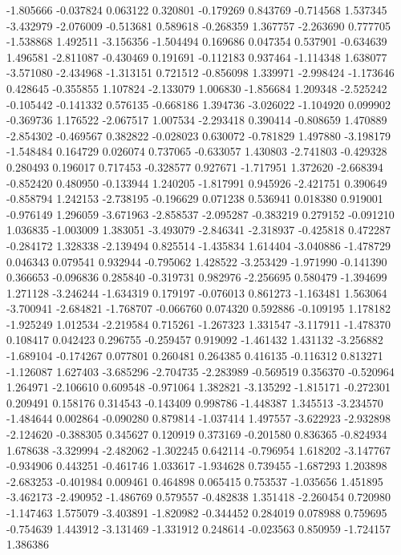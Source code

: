 -1.805666
-0.037824
0.063122
0.320801
-0.179269
0.843769
-0.714568
1.537345
-3.432979
-2.076009
-0.513681
0.589618
-0.268359
1.367757
-2.263690
0.777705
-1.538868
1.492511
-3.156356
-1.504494
0.169686
0.047354
0.537901
-0.634639
1.496581
-2.811087
-0.430469
0.191691
-0.112183
0.937464
-1.114348
1.638077
-3.571080
-2.434968
-1.313151
0.721512
-0.856098
1.339971
-2.998424
-1.173646
0.428645
-0.355855
1.107824
-2.133079
1.006830
-1.856684
1.209348
-2.525242
-0.105442
-0.141332
0.576135
-0.668186
1.394736
-3.026022
-1.104920
0.099902
-0.369736
1.176522
-2.067517
1.007534
-2.293418
0.390414
-0.808659
1.470889
-2.854302
-0.469567
0.382822
-0.028023
0.630072
-0.781829
1.497880
-3.198179
-1.548484
0.164729
0.026074
0.737065
-0.633057
1.430803
-2.741803
-0.429328
0.280493
0.196017
0.717453
-0.328577
0.927671
-1.717951
1.372620
-2.668394
-0.852420
0.480950
-0.133944
1.240205
-1.817991
0.945926
-2.421751
0.390649
-0.858794
1.242153
-2.738195
-0.196629
0.071238
0.536941
0.018380
0.919001
-0.976149
1.296059
-3.671963
-2.858537
-2.095287
-0.383219
0.279152
-0.091210
1.036835
-1.003009
1.383051
-3.493079
-2.846341
-2.318937
-0.425818
0.472287
-0.284172
1.328338
-2.139494
0.825514
-1.435834
1.614404
-3.040886
-1.478729
0.046343
0.079541
0.932944
-0.795062
1.428522
-3.253429
-1.971990
-0.141390
0.366653
-0.096836
0.285840
-0.319731
0.982976
-2.256695
0.580479
-1.394699
1.271128
-3.246244
-1.634319
0.179197
-0.076013
0.861273
-1.163481
1.563064
-3.700941
-2.684821
-1.768707
-0.066760
0.074320
0.592886
-0.109195
1.178182
-1.925249
1.012534
-2.219584
0.715261
-1.267323
1.331547
-3.117911
-1.478370
0.108417
0.042423
0.296755
-0.259457
0.919092
-1.461432
1.431132
-3.256882
-1.689104
-0.174267
0.077801
0.260481
0.264385
0.416135
-0.116312
0.813271
-1.126087
1.627403
-3.685296
-2.704735
-2.283989
-0.569519
0.356370
-0.520964
1.264971
-2.106610
0.609548
-0.971064
1.382821
-3.135292
-1.815171
-0.272301
0.209491
0.158176
0.314543
-0.143409
0.998786
-1.448387
1.345513
-3.234570
-1.484644
0.002864
-0.090280
0.879814
-1.037414
1.497557
-3.622923
-2.932898
-2.124620
-0.388305
0.345627
0.120919
0.373169
-0.201580
0.836365
-0.824934
1.678638
-3.329994
-2.482062
-1.302245
0.642114
-0.796954
1.618202
-3.147767
-0.934906
0.443251
-0.461746
1.033617
-1.934628
0.739455
-1.687293
1.203898
-2.683253
-0.401984
0.009461
0.464898
0.065415
0.753537
-1.035656
1.451895
-3.462173
-2.490952
-1.486769
0.579557
-0.482838
1.351418
-2.260454
0.720980
-1.147463
1.575079
-3.403891
-1.820982
-0.344452
0.284019
0.078988
0.759695
-0.754639
1.443912
-3.131469
-1.331912
0.248614
-0.023563
0.850959
-1.724157
1.386386
